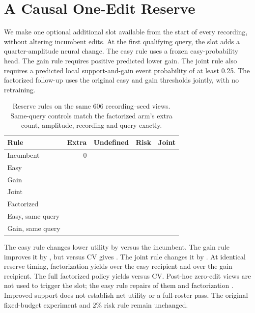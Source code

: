 \section{A Causal One-Edit Reserve}

We make one optional additional slot available from
the start of every recording, without altering incumbent
edits. At the first qualifying query, the slot adds a
quarter-amplitude neural change. The easy rule uses a
frozen easy-probability head. The gain rule requires positive
predicted lower gain. The joint rule also requires a
predicted local support-and-gain event probability of at
least 0.25. The factorized follow-up uses the original easy
and gain thresholds jointly, with no retraining.

\begin{table}[h]
\centering
\caption{Reserve rules on the same 606 recording--seed views.
Same-query controls match the factorized arm's extra count,
amplitude, recording and query exactly.}
\small
\begin{tabular}{lrrrr}
\toprule
Rule & Extra & Undefined & Risk & Joint \\
\midrule
Incumbent & 0 & \ReserveSlotBaseUndefined{} & \ReserveSlotBaseRisk{} & \ReserveSlotBasePass{} \\
Easy & \ReserveSlotEasyExtra{} & \ReserveSlotEasyUndefined{} & \ReserveSlotEasyRisk{} & \ReserveSlotEasyPass{} \\
Gain & \ReserveSlotGainExtra{} & \ReserveSlotGainUndefined{} & \ReserveSlotGainRisk{} & \ReserveSlotGainPass{} \\
Joint & \ReserveSlotJointExtra{} & \ReserveSlotJointUndefined{} & \ReserveSlotJointRisk{} & \ReserveSlotJointPass{} \\
Factorized & \ReserveSlotFactorExtra{} & \ReserveSlotFactorUndefined{} & \ReserveSlotFactorRisk{} & \ReserveSlotFactorPass{} \\
Easy, same query & \ReserveSlotEasyMatchExtra{} & \ReserveSlotEasyMatchUndefined{} & \ReserveSlotEasyMatchRisk{} & \ReserveSlotEasyMatchPass{} \\
Gain, same query & \ReserveSlotGainMatchExtra{} & \ReserveSlotGainMatchUndefined{} & \ReserveSlotGainMatchRisk{} & \ReserveSlotGainMatchPass{} \\
\bottomrule
\end{tabular}
\end{table}

The easy rule changes lower utility by \ReserveSlotEasyBase{}
versus the incumbent. The gain rule improves it by
\ReserveSlotGainBase{}, but versus CV gives \ReserveSlotGainCV{}.
The joint rule changes it by \ReserveSlotJointBase{}.
At identical reserve timing, factorization yields
\ReserveSlotFactorEasy{} over the easy recipient and
\ReserveSlotFactorGain{} over the gain recipient. The
full factorized policy yields \ReserveSlotFactorCV{} versus
CV. Post-hoc zero-edit views are not used to trigger the
slot; the easy rule repairs \ReserveSlotZeroEasy{} of them
and factorization \ReserveSlotZeroFactor{}.
Improved support does not establish net utility or a
full-roster pass. The original fixed-budget experiment
and 2\% risk rule remain unchanged.
